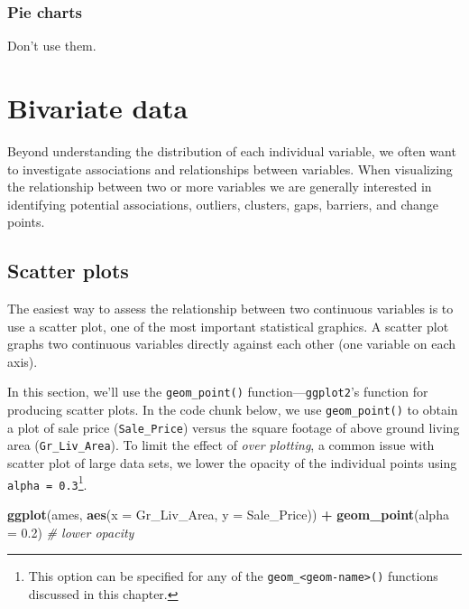 \documentclass[]{book}
\newenvironment{Shaded}{\begin{snugshade}}{\end{snugshade}}
\newcommand{\CommentTok}[1]{\textcolor[rgb]{0.56,0.35,0.01}{\textit{#1}}}
\newcommand{\DataTypeTok}[1]{\textcolor[rgb]{0.13,0.29,0.53}{#1}}
\newcommand{\FloatTok}[1]{\textcolor[rgb]{0.00,0.00,0.81}{#1}}
\newcommand{\KeywordTok}[1]{\textcolor[rgb]{0.13,0.29,0.53}{\textbf{#1}}}
\newcommand{\NormalTok}[1]{#1}
\newcommand{\OperatorTok}[1]{\textcolor[rgb]{0.81,0.36,0.00}{\textbf{#1}}}
\newcommand{\StringTok}[1]{\textcolor[rgb]{0.31,0.60,0.02}{#1}}
\let\rmarkdownfootnote\footnote%
\def\footnote{\protect\rmarkdownfootnote}
\theoremstyle{definition}
\theoremstyle{definition}
\theoremstyle{definition}
\theoremstyle{remark}
\begin{document}
\hypertarget{pie-charts}{%
\subsubsection{Pie charts}\label{pie-charts}}

Don't use them.

\hypertarget{bivariate-data}{%
\section{Bivariate data}\label{bivariate-data}}

Beyond understanding the distribution of each individual variable, we
often want to investigate associations and relationships between
variables. When visualizing the relationship between two or more
variables we are generally interested in identifying potential
associations, outliers, clusters, gaps, barriers, and change points.

\hypertarget{scatter-plots}{%
\subsection{Scatter plots}\label{scatter-plots}}

The easiest way to assess the relationship between two continuous
variables is to use a scatter plot, one of the most important
statistical graphics. A scatter plot graphs two continuous variables
directly against each other (one variable on each axis).

In this section, we'll use the \texttt{geom\_point()}
function---\texttt{ggplot2}'s function for producing scatter plots. In
the code chunk below, we use \texttt{geom\_point()} to obtain a plot of
sale price (\texttt{Sale\_Price}) versus the square footage of above
ground living area (\texttt{Gr\_Liv\_Area}). To limit the effect of
\emph{over plotting}, a common issue with scatter plot of large data
sets, we lower the opacity of the individual points using
\texttt{alpha\ =\ 0.3}\footnote{This option can be specified for any of
  the \texttt{geom\_\textless{}geom-name\textgreater{}()} functions
  discussed in this chapter.}.

\begin{Shaded}
\begin{Highlighting}[]
\KeywordTok{ggplot}\NormalTok{(ames, }\KeywordTok{aes}\NormalTok{(}\DataTypeTok{x =}\NormalTok{ Gr_Liv_Area, }\DataTypeTok{y =}\NormalTok{ Sale_Price)) }\OperatorTok{+}
\StringTok{  }\KeywordTok{geom_point}\NormalTok{(}\DataTypeTok{alpha =} \FloatTok{0.2}\NormalTok{)  }\CommentTok{# lower opacity}
\end{Highlighting}
\end{Shaded}
\end{document}
